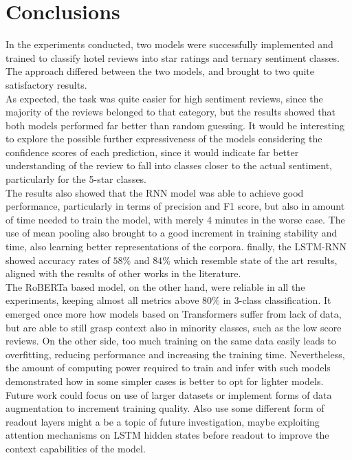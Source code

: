 \section{Conclusions}
\label{sec:conclusions}
    In the experiments conducted, two models were successfully implemented and trained 
    to classify hotel reviews into star ratings and ternary sentiment classes. The approach
    differed between the two models, and brought to two quite satisfactory results. \\
    
    As expected, the task was quite easier for high sentiment reviews, since the majority 
    of the reviews belonged to that category, but the results showed that both models
    performed far better than random guessing. It would be interesting to explore the
    possible further expressiveness of the models considering the confidence scores 
    of each prediction, since it would indicate far better understanding of the review
    to fall into classes closer to the actual sentiment, particularly for the 
    5-star classes. \\

    The results also showed that the RNN model was able to achieve good performance, 
    particularly in terms of precision and F1 score, but also in amount of time needed
    to train the model, with merely 4 minutes in the worse case. The use of mean pooling
    also brought to a good increment in training stability and time, also learning
    better representations of the corpora. finally, the LSTM-RNN showed accuracy
    rates of $58\%$ and $84\%$ which resemble state of the art results, aligned with
    the results of other works in the literature. \\

    The RoBERTa based model, on the other hand, were reliable in all the experiments, 
    keeping almost all metrics above $80\%$ in 3-class classification. It emerged
    once more how models based on Transformers suffer from lack of data, but are able
    to still grasp context also in minority classes, such as the low score reviews.
    On the other side, too much training on the same data easily leads to overfitting,
    reducing performance and increasing the training time. Nevertheless, the amount
    of computing power required to train and infer with such models demonstrated how
    in some simpler cases is better to opt for lighter models. \\

    Future work could focus on use of larger datasets or implement forms of data
    augmentation to increment training quality. Also use some different form of 
    readout layers might a be a topic of future investigation, maybe exploiting
    attention mechanisms on LSTM hidden states before readout to improve
    the context capabilities of the model.
    